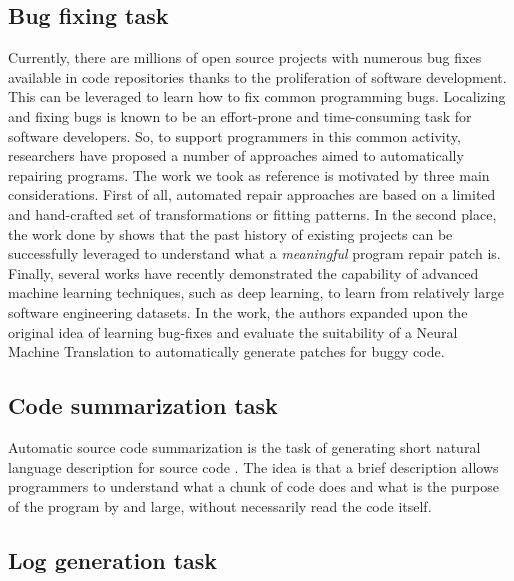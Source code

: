 \subsection{Bug fixing task}
Currently, there are millions of open source projects with numerous bug fixes available in code repositories
thanks to the proliferation of software development. This can be leveraged to learn how to fix common programming bugs. 
Localizing and fixing bugs is known to be an effort-prone and time-consuming task for software developers.
So, to support programmers in this common activity, researchers have proposed a number of approaches aimed to automatically repairing programs.
The work we took as reference is motivated by three main considerations. First of all, automated repair approaches are based on a limited and hand-crafted
set of transformations or fitting patterns. In the second place, the work done by \cite{} shows that the past history of 
existing projects can be successfully leveraged to understand what a \textit{meaningful} program repair patch is. Finally, 
several works have recently demonstrated the capability of advanced machine learning techniques, such as deep learning, to learn from relatively large software engineering
datasets. In the work, the authors expanded upon the original idea of learning bug-fixes and evaluate the suitability of a Neural Machine Translation to automatically
generate patches for buggy code.


\subsection{Code summarization task}
Automatic source code summarization is the task of generating short natural language description 
for source code \cite{Leclair2020}. The idea is that a brief description allows programmers to understand
what a chunk of code does and what is the purpose of the program by and large, without necessarily read the code 
itself.\\

\subsection{Log generation task}